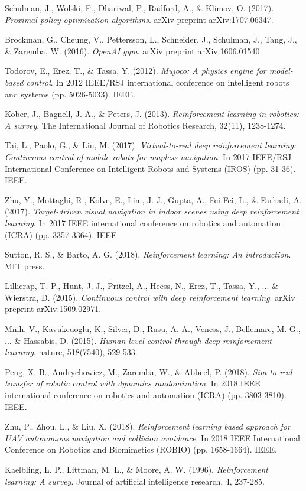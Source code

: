 \documentclass[12pt,a4paper]{article}
\begin{document}
\begin{thebibliography}{20}

Schulman, J., Wolski, F., Dhariwal, P., Radford, A., \& Klimov, O. (2017). 
\textit{Proximal policy optimization algorithms}. 
arXiv preprint arXiv:1707.06347.

Brockman, G., Cheung, V., Pettersson, L., Schneider, J., Schulman, J., Tang, J., \& Zaremba, W. (2016). 
\textit{OpenAI gym}. 
arXiv preprint arXiv:1606.01540.

Todorov, E., Erez, T., \& Tassa, Y. (2012). 
\textit{Mujoco: A physics engine for model-based control}. 
In 2012 IEEE/RSJ international conference on intelligent robots and systems (pp. 5026-5033). IEEE.

Kober, J., Bagnell, J. A., \& Peters, J. (2013). 
\textit{Reinforcement learning in robotics: A survey}. 
The International Journal of Robotics Research, 32(11), 1238-1274.

Tai, L., Paolo, G., \& Liu, M. (2017). 
\textit{Virtual-to-real deep reinforcement learning: Continuous control of mobile robots for mapless navigation}. 
In 2017 IEEE/RSJ International Conference on Intelligent Robots and Systems (IROS) (pp. 31-36). IEEE.

Zhu, Y., Mottaghi, R., Kolve, E., Lim, J. J., Gupta, A., Fei-Fei, L., \& Farhadi, A. (2017). 
\textit{Target-driven visual navigation in indoor scenes using deep reinforcement learning}. 
In 2017 IEEE international conference on robotics and automation (ICRA) (pp. 3357-3364). IEEE.

Sutton, R. S., \& Barto, A. G. (2018). 
\textit{Reinforcement learning: An introduction}. 
MIT press.

Lillicrap, T. P., Hunt, J. J., Pritzel, A., Heess, N., Erez, T., Tassa, Y., ... \& Wierstra, D. (2015). 
\textit{Continuous control with deep reinforcement learning}. 
arXiv preprint arXiv:1509.02971.

Mnih, V., Kavukcuoglu, K., Silver, D., Rusu, A. A., Veness, J., Bellemare, M. G., ... \& Hassabis, D. (2015). 
\textit{Human-level control through deep reinforcement learning}. 
nature, 518(7540), 529-533.

Peng, X. B., Andrychowicz, M., Zaremba, W., \& Abbeel, P. (2018). 
\textit{Sim-to-real transfer of robotic control with dynamics randomization}. 
In 2018 IEEE international conference on robotics and automation (ICRA) (pp. 3803-3810). IEEE.

Zhu, P., Zhou, L., \& Liu, X. (2018). 
\textit{Reinforcement learning based approach for UAV autonomous navigation and collision avoidance}. 
In 2018 IEEE International Conference on Robotics and Biomimetics (ROBIO) (pp. 1658-1664). IEEE.

Kaelbling, L. P., Littman, M. L., \& Moore, A. W. (1996). 
\textit{Reinforcement learning: A survey}. 
Journal of artificial intelligence research, 4, 237-285.

\end{thebibliography}
\end{document}
